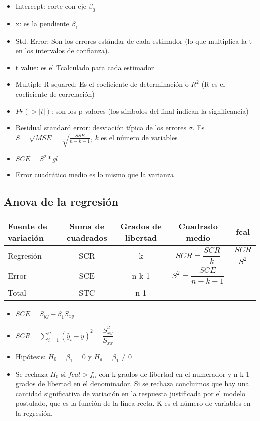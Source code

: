 \begin{itemize}
	\item Intercept: corte con eje $\beta_0$
	\item x: es la pendiente $\beta_1$
	\item Std. Error: Son los errores estándar de cada estimador (lo que multiplica la t en los intervalos de confianza).
	\item t value: es el Tcalculado para cada estimador
	\item Multiple R-squared: Es el coeficiente de determinación o $R^2$ (R es el coeficiente de correlación)
	\item $Pr(>|t|)$: son los p-valores (los símbolos del final indican la significancia)
	\item Residual standard error: desviación típica de los errores $\sigma$. Es $S=\sqrt{MSE}=\sqrt{\frac{SSE}{n-k-1}}$, $k$ es el número de variables
	\item $SCE=S^2*gl$
	\item Error cuadrático medio es lo mismo que la varianza
\end{itemize}

\subsection{Anova de la regresión}



\begin{tabular}{lcccc}
	\hline
	Fuente de variación & Suma de cuadrados & Grados de libertad & Cuadrado medio & fcal\\
	\hline
	Regresión & SCR & k & $SCR=\dfrac{SCR}{k}$ & $\dfrac{SCR}{S^2}$\\
	Error & SCE & n-k-1 & $S^2=\dfrac{SCE}{n-k-1}$ & \\
	\hline
	\hline
	Total & STC & n-1
\end{tabular}

\begin{itemize}
	\item $SCE=S_{yy}-\beta_1S_{xy}$
	\item $SCR=\sum_{i=1}^{n}(\hat{y}_i-\overline{y})^2=\dfrac{S_{xy}^2}{S_{xx}}$
	\item Hipótesis: $H_0=\beta_1=0$ y $H_a=\beta_1\not = 0$
	\item Se rechaza $H_0$ si $fcal>f_\alpha$ con k grados de libertad en el numerador y n-k-1 grados de libertad en el denominador. Si se rechaza concluimos que hay una cantidad significativa de variación en la respuesta justificada por el modelo postulado, que es la función de la línea recta. K es el número de variables en la regresión.
\end{itemize}

